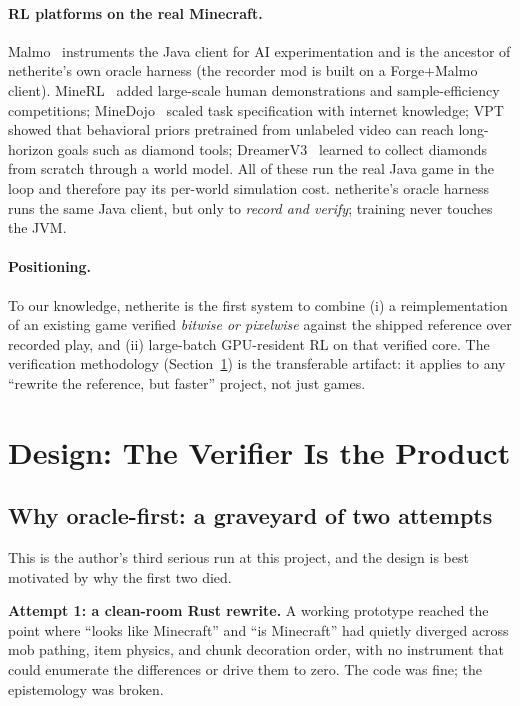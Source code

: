 \documentclass[11pt]{article}
\begin{document}
\paragraph{RL platforms on the real Minecraft.}
Malmo~\citep{johnson2016malmo} instruments the Java client for AI experimentation and is the ancestor of netherite's own oracle harness (the recorder mod is built on a Forge+Malmo client). MineRL~\citep{guss2019minerl} added large-scale human demonstrations and sample-efficiency competitions; MineDojo~\citep{fan2022minedojo} scaled task specification with internet knowledge; VPT~\citep{baker2022vpt} showed that behavioral priors pretrained from unlabeled video can reach long-horizon goals such as diamond tools; DreamerV3~\citep{hafner2023dreamerv3} learned to collect diamonds from scratch through a world model. All of these run the real Java game in the loop and therefore pay its per-world simulation cost. netherite's oracle harness runs the same Java client, but only to \emph{record and verify}; training never touches the JVM.

\paragraph{Positioning.}
To our knowledge, netherite is the first system to combine (i) a reimplementation of an existing game verified \emph{bitwise or pixelwise} against the shipped reference over recorded play, and (ii) large-batch GPU-resident RL on that verified core. The verification methodology (Section~\ref{sec:design}) is the transferable artifact: it applies to any ``rewrite the reference, but faster'' project, not just games.

\section{Design: The Verifier Is the Product}
\label{sec:design}

\subsection{Why oracle-first: a graveyard of two attempts}
\label{sec:graveyard}

This is the author's third serious run at this project, and the design is best motivated by why the first two died.

\textbf{Attempt 1: a clean-room Rust rewrite.} A working prototype reached the point where ``looks like Minecraft'' and ``is Minecraft'' had quietly diverged across mob pathing, item physics, and chunk decoration order, with no instrument that could enumerate the differences or drive them to zero. The code was fine; the epistemology was broken.
\end{document}
